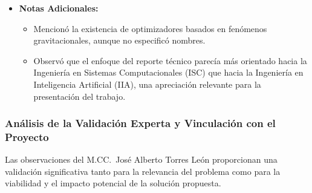 \begin{itemize}
    \item \textbf{Notas Adicionales:}
    \begin{itemize}
        \item Mencionó la existencia de optimizadores basados en fenómenos gravitacionales, aunque no especificó nombres.
        \item Observó que el enfoque del reporte técnico parecía más orientado hacia la Ingeniería en Sistemas Computacionales (ISC) que hacia la Ingeniería en Inteligencia Artificial (IIA), una apreciación relevante para la presentación del trabajo.
    \end{itemize}
\end{itemize}

\subsubsection{Análisis de la Validación Experta y Vinculación con el Proyecto}

Las observaciones del M.CC.\ José Alberto Torres León proporcionan una validación significativa tanto para la relevancia del problema como para la viabilidad y el impacto potencial de la solución propuesta.

